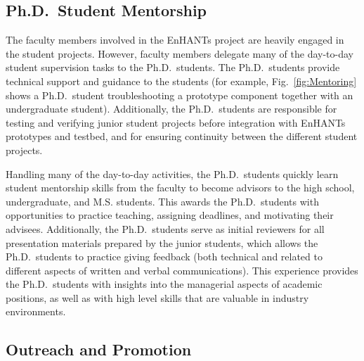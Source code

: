 \documentclass[journal,twopages]{IEEEtran}
\newcommand{\makered}[1]{\color{black}#1\color{black}}
\newcommand{\comment}[1]{}\newcommand{\morework}[1]{[#1]}
\begin{document}
\iffalse
\makered{The frequent demonstrations of the EnHANTs system necessitated rigorous \emph{risk management} of the many subsystems. The weekly meetings were used to ensure that components were on track for upcoming deadlines, and to adjust the goals accordingly. Off-site demonstrations entailed rigourous contingency planning. Of the many logistics to be considered were international shipping of our testbed, prototypes, and monitoring system and voltage and plug adapters to accommodate international power supplies. Additionally, we prepared 2--3 backup components for each subsystem, extensively testing each of the them while integrated with the rest of the system.}
\fi


\subsection{Ph.D.~Student Mentorship}
The faculty members involved in the EnHANTs project are heavily engaged in the student projects.
However, faculty members delegate many of the day-to-day student supervision tasks to the Ph.D.~students.
The Ph.D.\ students provide technical support and guidance to the students (for example, Fig.~\ref{fig:Mentoring} shows a Ph.D.\ student troubleshooting a prototype component together with an undergraduate student). Additionally, the Ph.D.\ students are responsible for testing and
verifying junior student projects before integration with EnHANTs prototypes and testbed, and for ensuring continuity between the different student projects. 


\makered{Handling many of the day-to-day activities, the Ph.D.\ students quickly learn student mentorship skills from the faculty to become advisors to the high school, undergraduate, and M.S. students.
This awards the Ph.D.\ students with opportunities to practice teaching, assigning deadlines, and motivating their advisees. Additionally, the Ph.D.\ students serve as initial reviewers for all presentation materials prepared by the junior students, which allows the Ph.D.\ students to practice giving feedback (both technical and related to different aspects of written and verbal communications). This experience provides the Ph.D.\ students with insights into the managerial aspects of academic positions, as well as with high level skills that are valuable in industry environments.} 


\subsection{Outreach and Promotion} \comment{new title here?}
\end{document}
